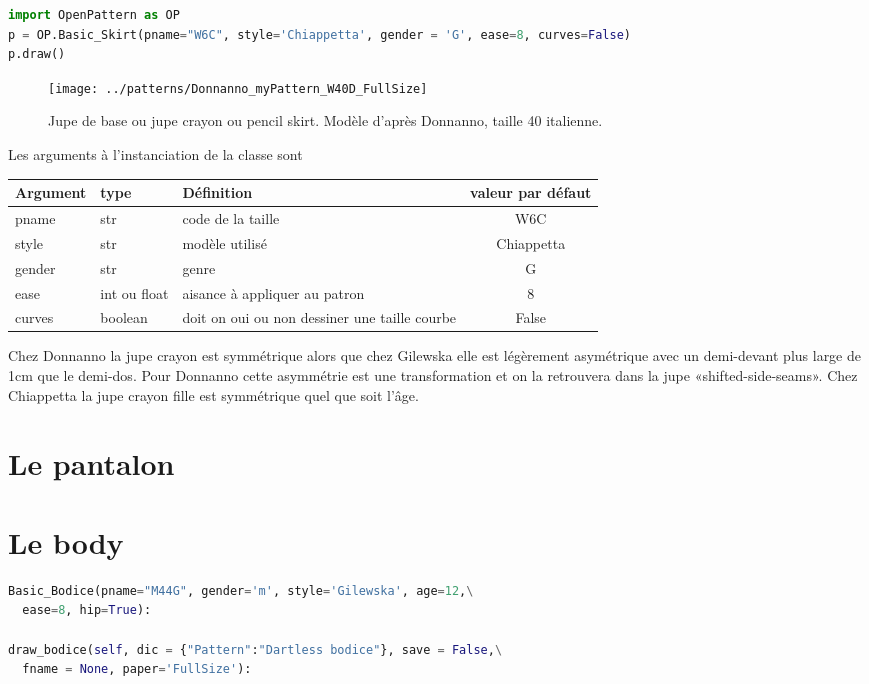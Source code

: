 \documentclass[10pt,a4paper,twoside]{report}
\begin{document}
\begin{lstlisting}[language=python]
import OpenPattern as OP
p = OP.Basic_Skirt(pname="W6C", style='Chiappetta', gender = 'G', ease=8, curves=False)
p.draw()
\end{lstlisting}

\begin{figure}[h]
\begin{center}
\texttt{[image: ../patterns/Donnanno\_myPattern\_W40D\_FullSize]}
\end{center}
\label{fig:pencil}
\caption{Jupe de base ou jupe crayon ou pencil skirt. Modèle d'après Donnanno, taille 40 italienne.}
\end{figure}



Les arguments à l'instanciation de la classe sont

\begin{tabular}{lllc}\\
Argument & type &  Définition & valeur par défaut\\ \hline
pname & str & code de la taille& W6C\\
style & str & modèle utilisé& Chiappetta\\
gender & str & genre & G\\
ease & int ou float & aisance à appliquer au patron& 8\\
curves & boolean & doit on oui ou non dessiner une taille courbe& False\\
\end{tabular}

Chez Donnanno la jupe crayon est symmétrique alors que chez Gilewska elle est légèrement asymétrique avec un demi-devant plus large de 1cm que le demi-dos. Pour Donnanno cette asymmétrie est une transformation et on la retrouvera dans la jupe «shifted-side-seams». Chez Chiappetta la jupe crayon fille est symmétrique quel que soit l'âge.

\section{Le pantalon}

\section{Le body}

\begin{lstlisting}[language=python]
Basic_Bodice(pname="M44G", gender='m', style='Gilewska', age=12,\
  ease=8, hip=True):

draw_bodice(self, dic = {"Pattern":"Dartless bodice"}, save = False,\
  fname = None, paper='FullSize'):

\end{lstlisting}
\end{document}
